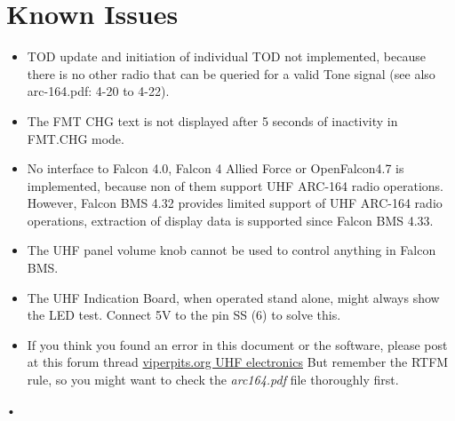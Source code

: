 \documentclass[12pt, a4paper]{report}
\begin{document}
\section{Known Issues}
\begin{itemize}
\item[]
TOD update and initiation of individual TOD not implemented, because there is no other radio that can be queried for a valid Tone signal (see also arc-164.pdf: 4-20 to 4-22).
\item[]
The FMT CHG text is not displayed after 5 seconds of inactivity in FMT.CHG mode.
\item[]
No interface to Falcon 4.0, Falcon 4 Allied Force or OpenFalcon4.7 is implemented, because non of them support UHF ARC-164 radio operations. 
However, Falcon BMS 4.32 provides limited support of UHF ARC-164 radio operations, extraction of display data is supported since Falcon BMS 4.33.
\item[]
The UHF panel volume knob cannot be used to control anything in Falcon BMS.
\item[]
The UHF Indication Board, when operated stand alone, might always show the LED test. Connect 5V to the pin SS (6) to solve this.
\item[]
If you think you found an error in this document or the software, please post at this forum thread
\href{http://www.viperpits.org/smf/index.php?topic=5082.0}{viperpits.org UHF electronics}
But remember the RTFM rule, so you might want to check the \emph{arc164.pdf} file thoroughly first.
\end{itemize}•


\tableofcontents
\end{document}
